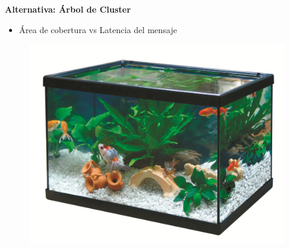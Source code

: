 \documentclass{beamer}
\begin{document}
\begin{frame}{\textbf{Alternativa: Árbol de Cluster}}
\fontsize{14pt}{15}\selectfont
\begin{minipage}[c]{1.0\linewidth}
\begin{minipage}[c]{0.6\linewidth}
	\begin{itemize}
		\item Área de cobertura vs Latencia del mensaje 
		\vspace{10px}
  	\end{itemize}	
  \end{minipage}
  \begin{minipage}[c]{0.35\linewidth}
	\begin{figure}[H]
		{\includegraphics[width=1\textwidth]{./imagenes/acuario.jpg}}
	\end{figure}	  	  	
  \end{minipage}
\end{minipage}
\end{frame}
\end{document}
